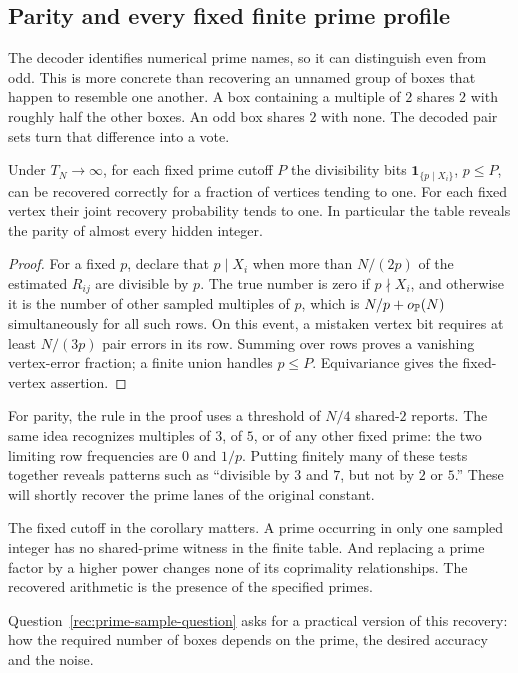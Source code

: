 \subsection{Parity and every fixed finite prime profile}

The decoder identifies numerical prime names, so it can distinguish
even from odd. This is more concrete than recovering an unnamed group
of boxes that happen to resemble one another. A box containing a
multiple of $2$ shares $2$ with roughly half the other boxes. An odd
box shares $2$ with none. The decoded pair sets turn that difference
into a vote.

\begin{corollary}\label{rec:profiles}
Under $T_N\to\infty$, for each fixed prime cutoff $P$ the divisibility
bits $\mathbf1_{\{p\mid X_i\}}$, $p\le P$, can be recovered correctly
for a fraction of vertices tending to one. For each fixed vertex their
joint recovery probability tends to one. In particular the table
reveals the parity of almost every hidden integer.
\end{corollary}
\begin{proof}
For a fixed $p$, declare that $p\mid X_i$ when more than $N/(2p)$ of
the estimated $R_{ij}$ are divisible by $p$. The true number is zero
if $p\nmid X_i$, and otherwise it is the number of other sampled
multiples of $p$, which is $N/p+o_{\mathbb P}(N)$ simultaneously for all
such rows. On this event, a mistaken vertex bit requires at least
$N/(3p)$ pair errors in its row. Summing over rows proves a vanishing
vertex-error fraction; a finite union handles $p\le P$. Equivariance
gives the fixed-vertex assertion.
\end{proof}

For parity, the rule in the proof uses a threshold of $N/4$ shared-$2$
reports. The same idea recognizes multiples of $3$, of $5$, or of any
other fixed prime: the two limiting row frequencies are $0$ and $1/p$.
Putting finitely many of these tests together reveals patterns such as
``divisible by $3$ and $7$, but not by $2$ or $5$.'' These will shortly
recover the prime lanes of the original constant.

The fixed cutoff in the corollary matters. A prime occurring in only
one sampled integer has no shared-prime witness in the finite table.
And replacing a prime factor by a higher power changes none of its
coprimality relationships. The recovered arithmetic is the presence of
the specified primes.

Question~\ref{rec:prime-sample-question} asks for a practical version
of this recovery: how the required number of boxes depends on the
prime, the desired accuracy and the noise.

